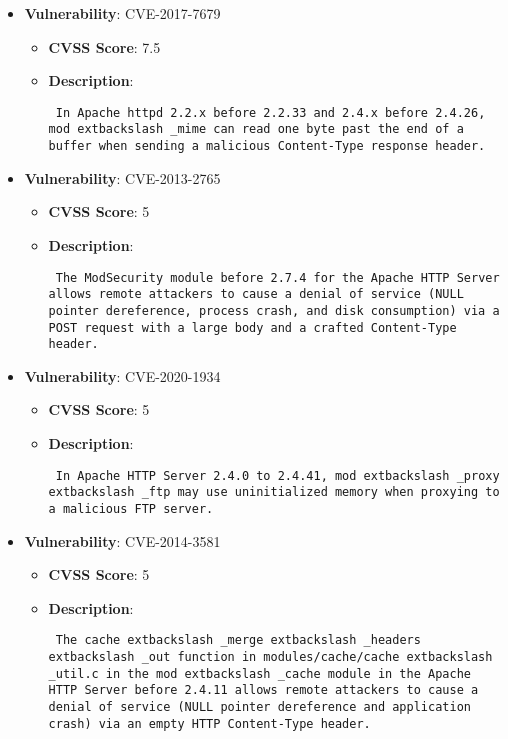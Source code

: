 \documentclass{article}
\begin{document}
\begin{itemize}
        \item \textbf{Vulnerability}: CVE-2017-7679
        \begin{itemize}
            \item \textbf{CVSS Score}:  7.5 
            \item \textbf{Description}: \parbox{\linewidth}{\texttt{ In Apache httpd 2.2.x before 2.2.33 and 2.4.x before 2.4.26, mod	extbackslash _mime can read one byte past the end of a buffer when sending a malicious Content-Type response header. }}
        \end{itemize}
    
        \item \textbf{Vulnerability}: CVE-2013-2765
        \begin{itemize}
            \item \textbf{CVSS Score}:  5 
            \item \textbf{Description}: \parbox{\linewidth}{\texttt{ The ModSecurity module before 2.7.4 for the Apache HTTP Server allows remote attackers to cause a denial of service (NULL pointer dereference, process crash, and disk consumption) via a POST request with a large body and a crafted Content-Type header. }}
        \end{itemize}
    
        \item \textbf{Vulnerability}: CVE-2020-1934
        \begin{itemize}
            \item \textbf{CVSS Score}:  5 
            \item \textbf{Description}: \parbox{\linewidth}{\texttt{ In Apache HTTP Server 2.4.0 to 2.4.41, mod	extbackslash _proxy	extbackslash _ftp may use uninitialized memory when proxying to a malicious FTP server. }}
        \end{itemize}
    
        \item \textbf{Vulnerability}: CVE-2014-3581
        \begin{itemize}
            \item \textbf{CVSS Score}:  5 
            \item \textbf{Description}: \parbox{\linewidth}{\texttt{ The cache	extbackslash _merge	extbackslash _headers	extbackslash _out function in modules/cache/cache	extbackslash _util.c in the mod	extbackslash _cache module in the Apache HTTP Server before 2.4.11 allows remote attackers to cause a denial of service (NULL pointer dereference and application crash) via an empty HTTP Content-Type header. }}
        \end{itemize}
    

\end{itemize}
\end{document}
